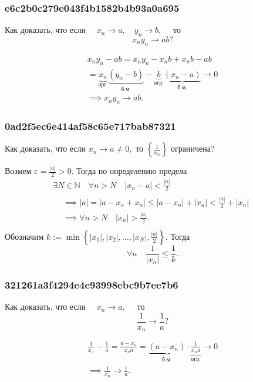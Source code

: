 \documentclass[11pt, a5paper]{article}
\newenvironment{note}[1]{\goodbreak\par\subsubsection{\hfill \color{lightgray}\tiny #1}}{}
\newenvironment{cloze}[2][\ldots]{\begin{leftbar}}{\end{leftbar}}
\begin{document}
    \begin{note}{e6c2b0c279e043f4b1582b4b93a0a695}
        Как доказать, что если \( \quad x_n \to a, \quad y_n \to b, \quad \) то \[
            x_n y_n \to ab?
        \]

        \begin{cloze}{1}
            \begin{multline*}
                x_n y_n - ab = x_n y_n - x_n b + x_n b - ab \\
                = \underbrace{x_n}_{\text{орг.}} \underbrace{(y_n -
                b)}_{\text{б.м.}} - \underbrace{b}_{\text{огр.}}
                \underbrace{(x_n - a)}_{\text{б.м.}} \longrightarrow 0 \\
                \implies x_n y_n \to ab.
            \end{multline*}
        \end{cloze}
    \end{note}

    \begin{note}{0ad2f5ec6e414af58c65e717bab87321}
        Как доказать, что если \( x_n \to a \neq 0,  \) то \( \left\{ \frac{1}{x_n} \right\} \) ограничена?

        \begin{cloze}{1}
            Возмем \( \varepsilon = \frac{|a|}{2} > 0. \) Тогда по определению предела \[
                \begin{gathered}
                    \exists N \in \mathbb N \quad \forall n > N \quad |x_n - a| < \frac{|a|}{2} \\
                    \begin{aligned}
                        &\implies |a| = |a - x_n + x_n| \leqslant |a - x_n| + |x_n| < \frac{|a|}{2} + |x_n| \\
                        &\implies \forall n > N \quad |x_n| > \frac{|a|}{2}. \\
                    \end{aligned}
                \end{gathered}
            \]
            Обозначим \( k := \min \left\{ |x_1|, |x_2|, \ldots, |x_N|, \frac{|a|}{2} \right\}. \) Тогда \[
                \forall n \quad \frac{1}{|x_n|} \leqslant \frac{1}{k}.
            \]
        \end{cloze}
    \end{note}

    \begin{note}{321261a3f4294e4e93998ebc9b7ee7b6}
        Как доказать, что если \( \quad x_n \to a, \quad \) то \[
            \frac{1}{x_n} \to \frac{1}{a}?
        \]

        \begin{cloze}{1}
            \begin{multline*}
                \frac{1}{x_n} - \frac{1}{a} = \frac{a - x_n}{x_n a} =
                \underbrace{(a - x_n)}_{\text{б.м.} }  \cdot
                \underbrace{\frac{1}{x_n a}}_{\text{огр.} } \to 0 \\
                \implies \frac{1}{x_n} \to \frac{1}{a}.
            \end{multline*}
        \end{cloze}
    \end{note}
\end{document}
